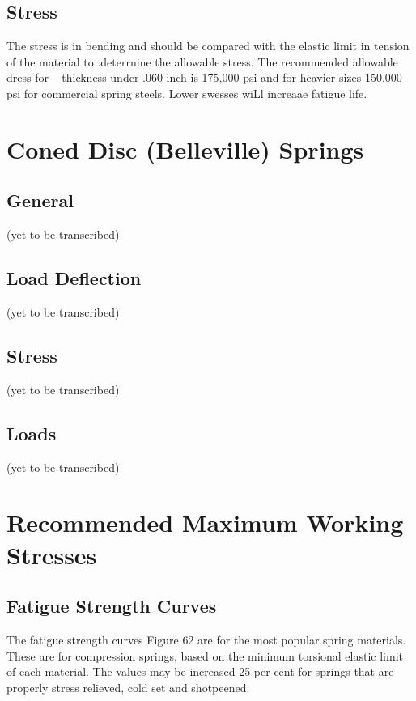 \documentclass[10pt]{article}
\begin{document}
\subsection{Stress} %
The stress is in bending and
should be compared with the elastic limit in
tension of the material to .deterrnine the allowable
stress. The recommended allowable
dress for ~ thickness under .060 inch is
175,000 psi and for heavier sizes 150.000 psi
for commercial spring steels. Lower swesses
wiLl increaae fatigue life.

\section{Coned Disc (Belleville) Springs} %
\subsection{General} %
(yet to be transcribed)

\subsection{Load Deflection} %
(yet to be transcribed)

\subsection{Stress} %
(yet to be transcribed)

\subsection{Loads} %
(yet to be transcribed)

\clearpage
\section{Recommended Maximum Working Stresses} %
\subsection{Fatigue Strength Curves} %
The fatigue strength curves Figure 62 are for the most popular spring materials. 
These are for compression springs, based on the minimum torsional elastic limit of each material. 
The values may be increased 25 per cent for springs that are properly stress relieved, cold set and shotpeened.
\end{document}
